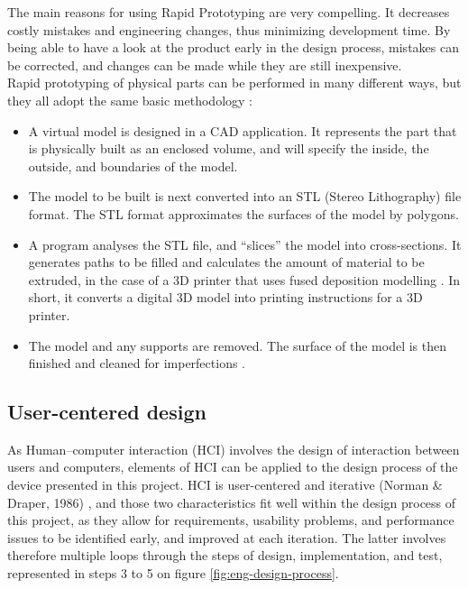 The main reasons for using Rapid Prototyping are very compelling. It decreases costly mistakes and engineering changes, thus minimizing development time. By being able to have a look at the product early in the design process, mistakes can be corrected, and changes can be made while they are still inexpensive. \\

Rapid prototyping of physical parts can be performed in many different ways, but they all adopt the same basic methodology \cite{chua2010-p10}:

\begin{itemize} \itemsep0em
  \item A virtual model is designed in a CAD application.  It represents the part that is physically built as an enclosed volume, and will specify the inside, the outside, and boundaries of the model.
  \item The model to be built is next converted into an STL (Stereo Lithography) file format. The STL format approximates the surfaces of the model by polygons.
  \item A program analyses the STL file, and ``slices'' the model into cross-sections. It generates paths to be filled and calculates the amount of material to be extruded, in the case of a 3D printer that uses fused deposition modelling \cite{slic3r}. In short, it converts a digital 3D model into printing instructions for a 3D printer.
  \item The model and any supports are removed. The surface of the model is then finished and cleaned for imperfections \cite{efunda}.
\end{itemize}

\subsection{User-centered design}

As Human–computer interaction (HCI) involves the design of interaction between users and computers, elements of HCI can be applied to the design process of the device presented in this project. HCI is user-centered and iterative (Norman \& Draper, 1986) \cite{Norman-1986}, and those two characteristics fit well within the design process of this project, as they allow for requirements, usability problems, and performance issues to be identified early, and improved at each iteration. The latter involves therefore multiple loops through the steps of design, implementation, and test, represented in steps 3 to 5 on figure \ref{fig:eng-design-process}. \\

